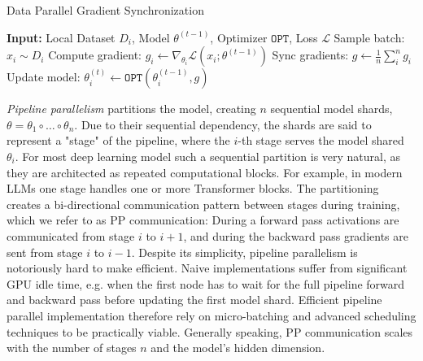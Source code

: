 \documentclass[conference, 10pt]{IEEEtran}
\begin{document}
\begin{algorithm}
\caption{Data Parallel Gradient Synchronization}
\label{alg:dp}
\begin{algorithmic}[1]
    \State \textbf{Input:} Local Dataset $D_i$, Model $\theta^{(t-1)}$, Optimizer $\mathtt{OPT}$, Loss $\mathcal{L}$
    \State Sample batch: $x_i\sim D_i$
    \State Compute gradient: $g_i \gets \nabla_{\theta_i} \mathcal{L}(x_i; \theta^{(t-1)})$
    \State Sync gradients: $g \gets \frac{1}{n}\sum_{i}^n g_i$ 
    \State Update model: $\theta_i^{(t)} \gets \mathtt{OPT}(\theta_i^{(t-1)}, g)$
\end{algorithmic}
\end{algorithm}

\textit{Pipeline parallelism} partitions the model, creating $n$ sequential
model shards, $\theta=\theta_1\circ\dots\circ\theta_n$. Due to their sequential
dependency, the shards are said to represent a "stage" of the pipeline, where
the $i$-th stage serves the model shared $\theta_i$. For most deep learning
model such a sequential partition is very natural, as they are architected as
repeated computational blocks. For example, in modern LLMs one stage handles one
or more Transformer blocks. The partitioning creates a bi-directional
communication pattern between stages during training, which we refer to as PP
communication: During a forward pass activations are communicated from stage $i$
to $i+1$, and during the backward pass gradients are sent from stage $i$ to
$i-1$.  Despite its simplicity, pipeline parallelism is notoriously hard to make
efficient. Naive implementations suffer from significant GPU idle time, e.g.
when the first node has to wait for the full pipeline forward and backward pass
before updating the first model shard. Efficient pipeline parallel
implementation therefore rely on micro-batching and advanced scheduling
techniques to be practically viable. Generally speaking, PP communication scales
with the number of stages $n$ and the model's hidden dimension.
\end{document}
